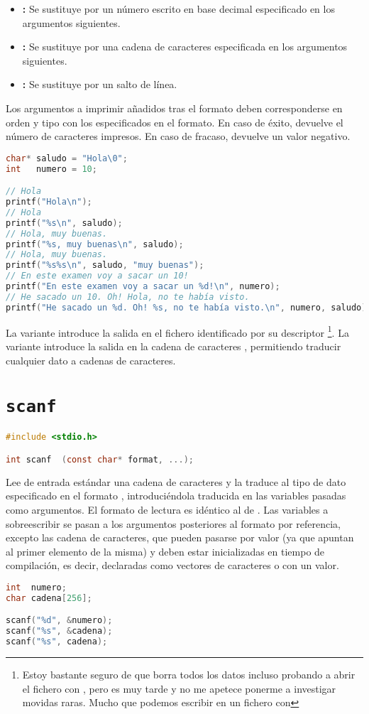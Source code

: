 \begin{itemize}
	\item{}\textbf{:} Se sustituye por un número escrito en base decimal especificado en los argumentos siguientes.
	\item{}\textbf{:} Se sustituye por una cadena de caracteres especificada en los argumentos siguientes.
	\item{}\textbf{:} Se sustituye por un salto de línea.
\end{itemize}

Los argumentos a imprimir añadidos tras el formato deben corresponderse en orden y tipo con los especificados en el formato.
En caso de éxito, devuelve el número de caracteres impresos.
En caso de fracaso, devuelve un valor negativo.

\begin{lstlisting}[language=C]
char* saludo = "Hola\0";
int   numero = 10;

// Hola
printf("Hola\n");
// Hola
printf("%s\n", saludo);
// Hola, muy buenas.
printf("%s, muy buenas\n", saludo);
// Hola, muy buenas.
printf("%s%s\n", saludo, "muy buenas");
// En este examen voy a sacar un 10!
printf("En este examen voy a sacar un %d!\n", numero);
// He sacado un 10. Oh! Hola, no te había visto.
printf("He sacado un %d. Oh! %s, no te había visto.\n", numero, saludo);
\end{lstlisting}

La variante  introduce la salida en el fichero identificado por su descriptor \footnote{Estoy bastante seguro de que borra todos los datos incluso probando a abrir el fichero con , pero es muy tarde y no me apetece ponerme a investigar movidas raras. Mucho que podemos escribir en un fichero con }.
La variante  introduce la salida en la cadena de caracteres , permitiendo traducir cualquier dato a cadenas de caracteres.

\section{\texttt{scanf}}

\begin{lstlisting}[language=C]
#include <stdio.h>

int scanf  (const char* format, ...);
\end{lstlisting}

Lee de entrada estándar una cadena de caracteres y la traduce al tipo de dato especificado en el formato , introduciéndola traducida en las variables pasadas como argumentos.
El formato de lectura es idéntico al de .
Las variables a sobreescribir se pasan a los argumentos posteriores al formato por referencia, excepto las cadena de caracteres, que pueden pasarse por valor (ya que apuntan al primer elemento de la misma) y deben estar inicializadas en tiempo de compilación, es decir, declaradas como vectores de caracteres o con un valor.

\begin{lstlisting}[language=C]
int  numero;
char cadena[256];

scanf("%d", &numero);
scanf("%s", &cadena);
scanf("%s", cadena);
\end{lstlisting}

